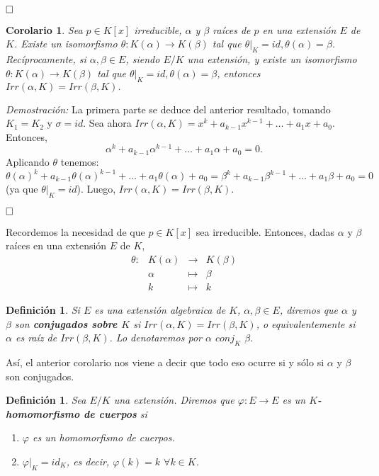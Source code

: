 \documentclass[12pt]{article}
\newtheorem{definition}[theorem]{Definición}
\newtheorem{corolario}{Corolario}[theorem]
\begin{document}
$\hfill \square$

\begin{corolario}\label{eq:irrcor} Sea $p \in K[x]$ irreducible, $\alpha$ y $\beta$ raíces de $p$ en una extensión $E$ de $K$. Existe un isomorfismo $\theta \colon K(\alpha) \longrightarrow K(\beta)$ tal que $\left. \theta \right|_K = id, \theta(\alpha) = \beta$. Recíprocamente, si $\alpha, \beta \in E$, siendo $E/K$ una extensión, y existe un isomorfismo $\theta \colon K(\alpha) \longrightarrow K(\beta)$ tal que $\left. \theta \right|_K = id, \theta(\alpha) = \beta$, entonces $Irr(\alpha, K) = Irr(\beta, K).$
\end{corolario}
\emph{Demostración: } La primera parte se deduce del anterior resultado, tomando $K_{1} = K_{2}$ y $\sigma = id$. Sea ahora $Irr(\alpha, K) = x^{k} + a_{k-1}x^{k-1} + \ldots + a_{1}x + a_{0}.$ Entonces, $$\alpha^{k} + a_{k-1}\alpha^{k-1} + \ldots + a_{1}\alpha + a_{0} =0.$$ Aplicando $\theta$ tenemos: $\theta( \alpha)^{k} + a_{k-1}\theta( \alpha)^{k-1} + \ldots + a_{1}\theta( \alpha) + a_{0} = \beta^{k} + a_{k-1}\beta^{k-1} + \ldots + a_{1}\beta + a_{0} = 0$ (ya que $\left. \theta \right|_K = id$). Luego, $Irr(\alpha, K) = Irr(\beta, K)$.

$\hfill \square$

Recordemos la necesidad de que $p \in K[x]$ sea irreducible. Entonces, dadas $\alpha$ y $\beta$ raíces en una extensión $E$ de $K$, $$\begin{array}{rccl}
\theta \colon &K(\alpha)&\longrightarrow &K(\beta) \\
&\alpha& \longmapsto &\beta \\
&k& \longmapsto &k
\end{array}
$$ 
\begin{definition} Si $E$ es una extensión algebraica de $K$, $\alpha, \beta \in E$, diremos que $\alpha$ y $\beta$ son \textbf{conjugados sobre $K$} si $Irr(\alpha, K) = Irr(\beta, K)$, o equivalentemente si $\alpha$ es raíz de $Irr(\beta, K)$. Lo denotaremos por $\alpha$ $conj_{K}$ $\beta$.
\end{definition}

Así, el anterior corolario nos viene a decir que todo eso ocurre si y sólo si $\alpha$ y $\beta$ son conjugados.

\begin{definition} Sea $E/K$ una extensión. Diremos que $\varphi \colon E \longrightarrow E$ es un \textbf{$K$-homomorfismo de cuerpos} si \begin{enumerate}
\item $\varphi$ es un homomorfismo de cuerpos.
\item $ \left.\varphi \right|_K  = id_{K}$, es decir, $\varphi (k) = k$ $\forall k \in K$. 
\end{enumerate}
\end{definition}
\end{document}
